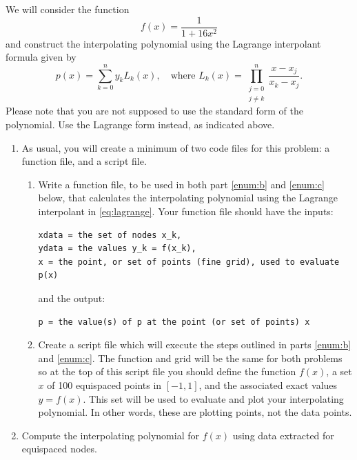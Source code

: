 We will consider the function
\begin{equation*}
  f(x)
  = \frac{1}{1 + 16 x^{2}}
\end{equation*}
and construct the interpolating polynomial using the Lagrange interpolant formula given by
\begin{equation}
  \label{eq:lagrange}
  p(x)
  = \sum_{k = 0}^{n} y_{k} L_{k}(x),
  \quad \text{where $L_{k}(x) = \prod_{\substack{j = 0 \\ j \ne k}}^{n} \frac{x - x_{j}}{x_{k} - x_{j}}$}.
\end{equation}
Please note that you are not supposed to use the standard form of the polynomial. Use the Lagrange form instead, as indicated above.
\begin{enumerate}[label=(\alph*)]
  \item \label{enum:a} As usual, you will create a minimum of two code files for this problem: a function file, and a script file.
    \begin{enumerate}[label=(\roman*)]
      \item Write a function file, to be used in both part \ref{enum:b} and \ref{enum:c} below, that calculates the interpolating polynomial using the Lagrange interpolant in \eqref{eq:lagrange}. Your function file should have the inputs:
        \begin{lstlisting}[style=Plain,numbers=none]
xdata = the set of nodes x_k,
ydata = the values y_k = f(x_k),
x = the point, or set of points (fine grid), used to evaluate p(x)
        \end{lstlisting}
        and the output:
        \begin{lstlisting}[style=Plain,numbers=none]
p = the value(s) of p at the point (or set of points) x
        \end{lstlisting}
      \item Create a script file which will execute the steps outlined in parts \ref{enum:b} and \ref{enum:c}. The function and grid will be the same for both problems so at the top of this script file you should define the function $f(x)$, a set $x$ of 100  equispaced points in $[-1, 1]$, and the associated exact values $y = f(x)$. This set will be used to evaluate and plot your interpolating polynomial. In other words, these are plotting points, not the data points.
    \end{enumerate}
  \item \label{enum:b} Compute the interpolating polynomial for $f(x)$ using data extracted for equispaced nodes.
    \begin{enumerate}[label=(\roman*)]

\end{enumerate}
\end{enumerate}

